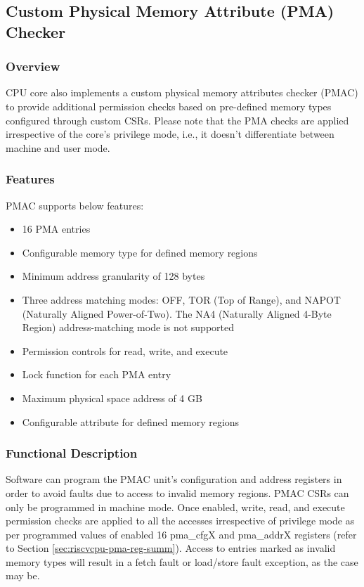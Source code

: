 \documentclass[main\_\_EN.tex]{subfiles}
\begin{document}
\newpage
\subsection{Custom Physical Memory Attribute (PMA) Checker}
\label{sec:riscvcpu-pma}
\subsubsection{Overview}
\label{sec:riscvcpu-pma-overview}
CPU core also implements a custom physical memory attributes checker (PMAC) to provide additional permission checks based on pre-defined memory types configured through custom CSRs. Please note that the PMA checks are applied irrespective of the core's privilege mode, i.e., it doesn't differentiate between machine and user mode.


\subsubsection{Features}
\label{sec:riscvcpu-pma-features}

PMAC supports below features:

\begin{itemize}
    \item 16 PMA entries
    \item Configurable memory type for defined memory regions
    \item Minimum address granularity of 128 bytes
    \item Three address matching modes: OFF, TOR (Top of Range), and NAPOT (Naturally Aligned Power-of-Two). The NA4 (Naturally Aligned 4-Byte Region) address-matching mode is not supported
    \item Permission controls for read, write, and execute
    \item Lock function for each PMA entry
    \item Maximum physical space address of 4 GB
    \item Configurable attribute for defined memory regions
\end{itemize}

\subsubsection{Functional Description}
\label{sec:riscvcpu-pma-func-descr}

Software can program the PMAC unit's configuration and address registers in order to avoid faults due to access to invalid memory regions. PMAC CSRs can only be programmed in machine mode. Once enabled, write, read, and execute permission checks are applied to all the accesses irrespective of privilege mode as per programmed values of enabled 16 pma\_cfgX and pma\_addrX registers (refer to Section \ref{sec:riscvcpu-pma-reg-summ}). Access to entries marked as invalid memory types will result in a fetch fault or load/store fault exception, as the case may be.
\end{document}
